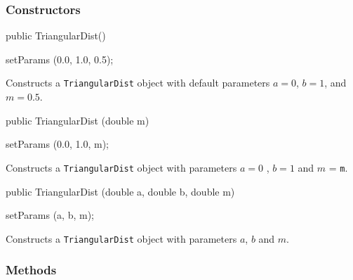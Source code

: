 \subsubsection* {Constructors}

\begin{code}

   public TriangularDist()\begin{hide} {
      setParams (0.0, 1.0, 0.5);
   }\end{hide}
\end{code}
  \begin{tabb} Constructs a \texttt{TriangularDist} object with default parameters
   $a=0$, $b=1$, and $m=0.5$.
  \end{tabb}
\begin{code}

   public TriangularDist (double m)\begin{hide} {
      setParams (0.0, 1.0, m);
   }\end{hide}
\end{code}
 \begin{tabb} Constructs a \texttt{TriangularDist} object with parameters $a = 0$ ,
 $b = 1$ and $m$ = \texttt{m}.
 \end{tabb}
\begin{code}

   public TriangularDist (double a, double b, double m)\begin{hide} {
      setParams (a, b, m);
   }\end{hide}
\end{code}
 \begin{tabb} Constructs a \texttt{TriangularDist} object with
   parameters $a$, $b$ and $m$.
 \end{tabb}

\subsubsection* {Methods}

